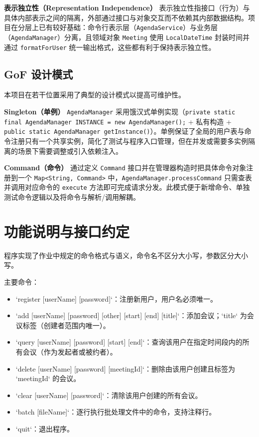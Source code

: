 \textbf{表示独立性（Representation Independence）}
表示独立性指接口（行为）与具体内部表示之间的隔离，外部通过接口与对象交互而不依赖其内部数据结构。项目在分层上已有较好基础：命令行表示层（\texttt{AgendaService}）与业务层（\texttt{AgendaManager}）分离，且领域对象 \texttt{Meeting} 使用 \texttt{LocalDateTime} 封装时间并通过 \texttt{formatForUser} 统一输出格式，这些都有利于保持表示独立性。

\section{GoF 设计模式}

本项目在若干位置采用了典型的设计模式以提高可维护性。

\textbf{Singleton（单例）}
\texttt{AgendaManager} 采用饿汉式单例实现（\texttt{private static final AgendaManager INSTANCE = new AgendaManager();} + 私有构造 + \texttt{public static AgendaManager getInstance()}）。单例保证了全局的用户表与命令注册只有一个共享实例，简化了测试与程序入口管理，但在并发或需要多实例隔离的场景下需要调整或引入依赖注入。

\textbf{Command（命令）}
通过定义 \texttt{Command} 接口并在管理器构造时把具体命令对象注册到一个 \texttt{Map<String, Command>} 中，\texttt{AgendaManager.processCommand} 只需查表并调用对应命令的 \texttt{execute} 方法即可完成请求分发。此模式便于新增命令、单独测试命令逻辑以及将命令与解析/调用解耦。


\chapter{功能说明与接口约定}
程序实现了作业中规定的命令格式与语义，命令名不区分大小写，参数区分大小写。

主要命令：
\begin{itemize}
  \item `register [userName] [password]`：注册新用户，用户名必须唯一。
  \item `add [userName] [password] [other] [start] [end] [title]`：添加会议；`title` 为会议标签（创建者范围内唯一）。
  \item `query [userName] [password] [start] [end]`：查询该用户在指定时间段内的所有会议（作为发起者或被约者）。
  \item `delete [userName] [password] [meetingId]`：删除由该用户创建且标签为 `meetingId` 的会议。
  \item `clear [userName] [password]`：清除该用户创建的所有会议。
  \item `batch [fileName]`：逐行执行批处理文件中的命令，支持注释行。
  \item `quit`：退出程序。
\end{itemize}

